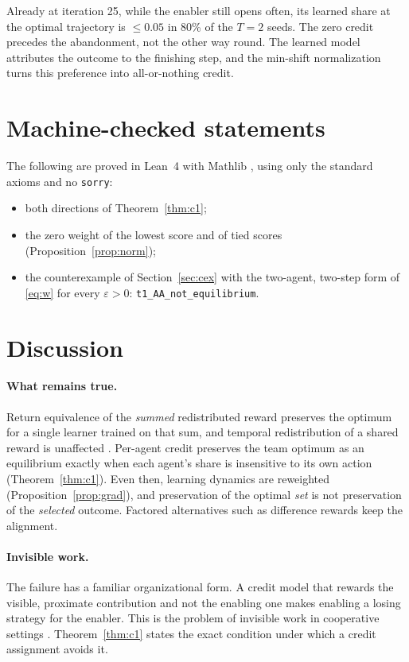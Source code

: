 \documentclass[11pt]{article}
\theoremstyle{remark}
\begin{document}
Already at iteration 25, while the enabler still opens often, its learned share at the optimal trajectory is $\le0.05$ in 80\% of the $T=2$ seeds. The zero credit precedes the abandonment, not the other way round. The learned model attributes the outcome to the finishing step, and the min-shift normalization turns this preference into all-or-nothing credit.

\section{Machine-checked statements}\label{sec:lean}

The following are proved in Lean~4 with Mathlib \citep{demoura2021lean4,mathlib2020}, using only the standard axioms and no \texttt{sorry}:
\begin{itemize}
\item both directions of Theorem~\ref{thm:c1};
\item the zero weight of the lowest score and of tied scores (Proposition~\ref{prop:norm});
\item the counterexample of Section~\ref{sec:cex} with the two-agent, two-step form of \eqref{eq:w} for every $\varepsilon>0$: \texttt{t1\_AA\_not\_equilibrium}.
\end{itemize}

\section{Discussion}

\paragraph{What remains true.} Return equivalence of the \emph{summed} redistributed reward preserves the optimum for a single learner trained on that sum, and temporal redistribution of a shared reward is unaffected \citep{xiao2022arel,arjonamedina2019rudder}. Per-agent credit preserves the team optimum as an equilibrium exactly when each agent's share is insensitive to its own action (Theorem~\ref{thm:c1}). Even then, learning dynamics are reweighted (Proposition~\ref{prop:grad}), and preservation of the optimal \emph{set} is not preservation of the \emph{selected} outcome. Factored alternatives such as difference rewards \citep{wolpert1999coin} keep the alignment.

\paragraph{Invisible work.} The failure has a familiar organizational form. A credit model that rewards the visible, proximate contribution and not the enabling one makes enabling a losing strategy for the enabler. This is the problem of invisible work in cooperative settings \citep{star1999layers}. Theorem~\ref{thm:c1} states the exact condition under which a credit assignment avoids it.
\end{document}
